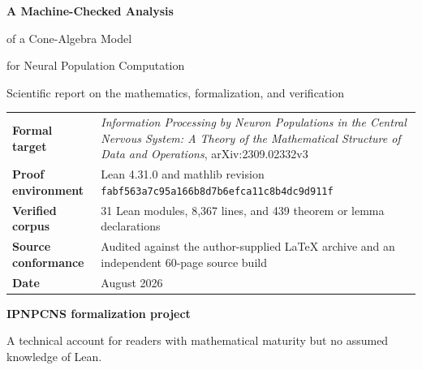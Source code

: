 \documentclass[11pt,a4paper]{article}
\begin{document}
\hypersetup{pageanchor=false}
\begin{titlepage}
  \thispagestyle{empty}

  \vspace*{14mm}
  {\color{white}\sffamily\bfseries\fontsize{27}{32}\selectfont
    A Machine-Checked Analysis\par
    of a Cone-Algebra Model\par
    for Neural Population Computation\par}
  \vspace{7mm}
  {\color{white}\sffamily\Large
    Scientific report on the mathematics, formalization, and verification\par}

  \vfill

  \begin{tcolorbox}[
    colback=white,
    colframe=ReportCyan,
    boxrule=0.8pt,
    arc=1.5mm,
    left=4mm,right=4mm,top=3mm,bottom=3mm
  ]
  \begin{tabularx}{\linewidth}{@{}L{39mm}Y@{}}
    \textbf{Formal target} &
      \emph{Information Processing by Neuron Populations in the Central
      Nervous System: A Theory of the Mathematical Structure of Data and
      Operations}, arXiv:2309.02332v3 \\
    \textbf{Proof environment} &
      Lean 4.31.0 and mathlib revision
      \texttt{fabf563a7c95a166b8d7b6efca11c8b4dc9d911f} \\
    \textbf{Verified corpus} &
      31 Lean modules, 8,367 lines, and 439 theorem or lemma declarations \\
    \textbf{Source conformance} &
      Audited against the author-supplied LaTeX archive and an independent
      60-page source build \\
    \textbf{Date} & August 2026
  \end{tabularx}
  \end{tcolorbox}

  \vspace{12mm}
  {\large\color{ReportNavy}\textbf{IPNPCNS formalization project}}\par
  \vspace{2mm}
  {\color{ReportGray}
    A technical account for readers with mathematical maturity but no
    assumed knowledge of Lean.}
\end{titlepage}
\end{document}
